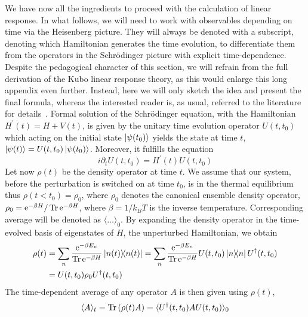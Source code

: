 We have now all the ingredients to proceed with the calculation of linear response.
In what follows, we will need to work with observables depending on time via the Heisenberg picture. They will always be
denoted with a subscript, denoting which Hamiltonian generates the time evolution,
to differentiate them from the operators in the Schrödinger picture with explicit time-dependence.
Despite the pedagogical character of this section, we will
refrain from the full derivation of the Kubo linear response theory, as this would enlarge this long
appendix even further. Instead, here we will only sketch the idea and present the final formula,
whereas the interested reader is, as usual, referred to the literature for details~\autocite{Mahan2000,Pottier2014,Gohmann2021}.
Formal solution of the Schrödinger equation, with the Hamiltonian \(H^{\prime}(t) = H + V(t)\), is given
by the unitary time evolution operator \(U(t,t_{0})\) which acting on the initial state \(\ket{\psi
    (t_{0})}\) yields the state at time \(t\), \(\ket{\psi (t)} = U(t,t_{0}) \ket{\psi (t_{0})}\).
Moreover, it fulfills the equation
\begin{equation}
    i \partial_t U(t,t_{0}) = H^{\prime}(t) U(t,t_{0})
    \label{eq:time_evolution_operator}
\end{equation}
Let now \(\rho (t)\) be the density operator at time \(t\).
We assume that our system, before the perturbation is switched on at time \(t_0\), is in the thermal equilibrium
thus \(\rho (t<t_0 ) = \rho_0\), where \(\rho_0\) denotes the canonical ensemble density operator,
\( \rho_0 = \mathrm{e}^{-\beta H} / \Tr \mathrm{e}^{-\beta
    H}\), where \(\beta = 1 / k_B T\) is the inverse temperature. Corresponding average will be
denoted as \(\langle \dots  \rangle_0 \). By expanding the density operator in the time-evolved basis
of eigenstates of \(H\), the unperturbed Hamiltonian, we obtain
\begin{align}
    \rho (t) & = \sum_{n} \frac{\mathrm{e}^{-\beta E_n} }{\Tr \mathrm{e}^{-\beta H}} \ketbra{n(t)}{n(t)} = \sum_n \frac{\mathrm{e}^{-\beta E_n}}{\Tr \mathrm{e}^{-\beta H}} U(t,t_0) \ketbra{n}{n} U^{\dag}(t,t_0)\nonumber \\
             & = U(t,t_0) \rho_0 U^{\dag}(t,t_0)
\end{align}
The time-dependent average of any operator \(A\) is then
given using \(\rho (t)\),
\begin{equation}
    \langle A \rangle_t = \Tr \left( \rho (t) A \right) = \langle U^{\dag}(t,t_0)  A  U(t,t_0)\rangle_0
\end{equation}
